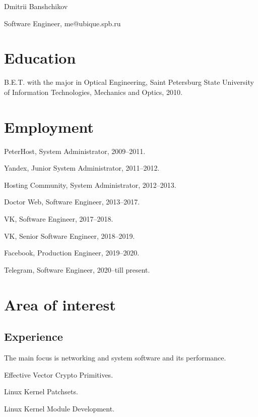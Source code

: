 \documentclass[letterpaper]{article}
\def\name{Dmitrii Banshchikov}
\renewenvironment{itemize}{
  \begin{list}{}{
    \setlength{\leftmargin}{1.5em}
  }
}{
  \end{list}
}
\begin{document}
{\huge \name}


\vspace{0.25in}

\begin{minipage}{0.45\linewidth}
  {Software Engineer, me@ubique.spb.ru} \\
\end{minipage}
\begin{minipage}{0.45\linewidth}
\end{minipage}


\section*{Education}

\begin{itemize}
  \item B.E.T. with the major in Optical Engineering, Saint Petersburg State University of Information Technologies, Mechanics and Optics, 2010.
\end{itemize}


\section*{Employment}

\begin{itemize}
\item PeterHost, System Administrator, 2009--2011.
\item Yandex, Junior System Administrator, 2011--2012.
\item Hosting Community, System Administrator, 2012--2013.
\item Doctor Web, Software Engineer, 2013--2017.
\item VK, Software Engineer, 2017--2018.
\item VK, Senior Software Engineer, 2018--2019.
\item Facebook, Production Engineer, 2019--2020.
\item Telegram, Software Engineer, 2020--till present.
\end{itemize}


\section*{Area of interest}

\subsection*{Experience}
\begin{itemize}
\item The main focus is networking and system software and its performance.
\item Effective Vector Crypto Primitives.
\item Linux Kernel Patchsets.
\item Linux Kernel Module Development.
\end{itemize}
\end{document}
